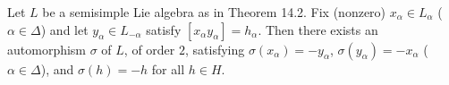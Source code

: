 Let $L$ be a semisimple Lie algebra as in Theorem 14.2. Fix (nonzero) $x_\alpha \in L_\alpha$ ($\alpha \in \Delta$) and let $y_\alpha \in L_{-\alpha}$ satisfy $[x_\alpha y_\alpha] = h_\alpha$. Then there exists an automorphism $\sigma$ of $L$, of order $2$, satisfying $\sigma(x_\alpha) = -y_\alpha$, $\sigma(y_\alpha) = -x_\alpha$ ($\alpha \in \Delta$), and $\sigma(h) = -h$ for all $h \in H$.